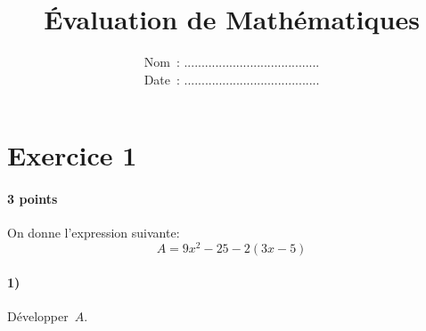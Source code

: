 \documentclass[a4paper]{article}
\begin{document}
  \title{Évaluation de Mathématiques}
  \date{
    Nom~: .......................................\\
    \vspace{0.2cm}
    Date~: .......................................}
  \maketitle

  \section*{Exercice 1}
  \paragraph{3 points}
  On donne l'expression suivante:
  \[
    A = 9 x^2 - 25 - 2(3x - 5)
  \]
  \paragraph{1)} Développer~$A$.
\end{document}
